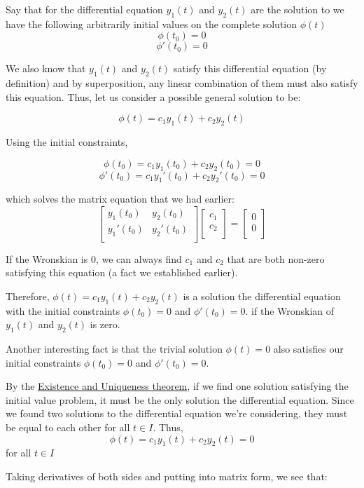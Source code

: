 \documentclass{report}
\begin{document}
{Say that for the differential equation $y_1(t)$ and $y_2(t)$ are the solution to we have the following arbitrarily initial values on the complete solution $\phi(t)$
$$\phi(t_0) = 0$$
$$\phi'(t_0) = 0$$


We also know that $y_1(t)$ and $y_2(t)$ satisfy this differential equation (by definition) and by superposition, any linear combination of them must also satisfy this equation. Thus, let us consider a possible  general solution to be:

$$\phi(t) = c_1y_1(t) +c_2y_2(t)$$

Using the initial constraints,

$$\phi(t_0) = c_1y_1(t_0) +c_2y_2(t_0) = 0$$
$$\phi'(t_0) = c_1y_1'(t_0) +c_2y_2'(t_0) = 0$$

which solves the matrix equation that we had earlier:
$$
\begin{bmatrix}
    y_1(t_0) & y_2(t_0) \\
    y_1'(t_0) & y_2'(t_0) \\
\end{bmatrix}
\begin{bmatrix}
    c_1 \\
    c_2 \\
\end{bmatrix}
=
\begin{bmatrix}
    0 \\
    0 \\
\end{bmatrix}
$$

If the Wronskian is 0, we can always find $c_1$ and $c_2$ that are both non-zero satisfying this equation (a fact we established earlier). 

Therefore, $\phi(t) = c_1y_1(t) + c_2y_2(t)$ is a solution the differential equation with the initial constraints $\phi(t_0) = 0$ and $\phi'(t_0) = 0$. if the Wronskian of $y_1(t)$ and $y_2(t)$ is zero. 

Another interesting fact is that the trivial solution $\phi(t) = 0$ also satisfies our initial constraints $\phi(t_0) = 0$ and $\phi'(t_0) = 0$.

By the  \hyperref[th:Ex&Un]{Existence and Uniqueness theorem}, if we find one solution satisfying the initial value problem, it must be the only solution the differential equation. Since we found two solutions to the differential equation we're considering, they must be equal to each other for all $t \in I$.
Thus,
$$\phi(t) = c_1y_1(t) +c_2y_2(t) = 0$$
for all $t \in I$

Taking derivatives of both sides and putting into matrix form, we see that:

}
\end{document}
